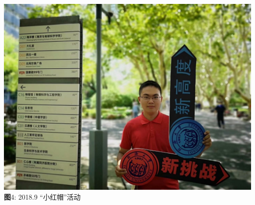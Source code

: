 \documentclass[10pt]{beamer}
\begin{document}
\begin{frame}
{\begin{center}
\includegraphics[width=.415\paperwidth]{redhat2.jpg}\\
\footnotesize \textbf{图}4: 2018.9 ``小红帽''活动\end{center}}
\end{frame}
\end{document}
